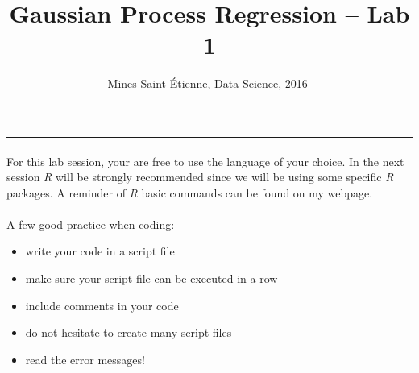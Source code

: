 \documentclass[11pt]{scrartcl}
\title{Gaussian Process Regression -- Lab 1}
\author{Mines Saint-\'Etienne, Data Science,  2016\:-\:2017 }
\date{}
\begin{document}
\maketitle
\vspace{-1cm}
\hrule
\vspace{5mm}

\paragraph{}
For this lab session, your are free to use the language of your choice. In the next session \emph{R} will be strongly recommended since we will be using some specific \emph{R} packages. A reminder of \emph{R} basic commands can be found on my webpage. 

\paragraph{}
A few good practice when coding:
\begin{itemize}
	\item write your code in a script file
	\item make sure your script file can be executed in a row
	\item include comments in your code
	\item do not hesitate to create many script files
	\item read the error messages!
\end{itemize}
\end{document}
